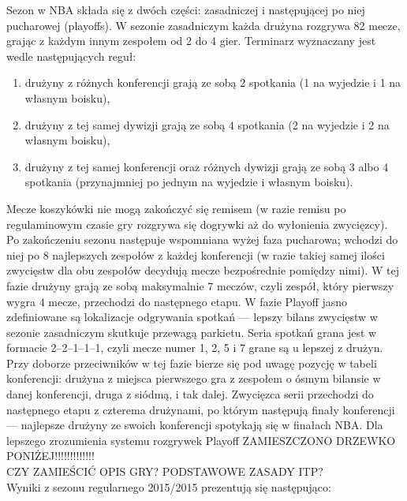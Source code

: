 \documentclass[inzynierska]{pwr_wmat_praca_dyplomowa}
\theoremstyle{plain}
\numberwithin{theorem}{chapter}
\theoremstyle{definition}
\numberwithin{theorem}{chapter}
\begin{document}
Sezon w NBA składa się z dwóch części: zasadniczej i następującej po niej pucharowej (playoffs). W sezonie zasadniczym każda drużyna rozgrywa 82 mecze, grając z każdym innym zespołem od 2 do 4 gier. Terminarz wyznaczany jest wedle następujących reguł:
\begin{enumerate}
	\item drużyny z różnych konferencji grają ze sobą 2 spotkania (1 na wyjedzie i 1 na własnym boisku),
	\item drużyny z tej samej dywizji grają ze sobą 4 spotkania (2 na wyjedzie i 2 na własnym boisku),
	\item drużyny z tej samej konferencji oraz różnych dywizji grają ze sobą 3 albo 4 spotkania (przynajmniej po jednym na wyjedzie i własnym boisku).
\end{enumerate}
Mecze koszykówki nie mogą zakończyć się remisem (w razie remisu po regulaminowym czasie gry rozgrywa się dogrywki aż do wyłonienia zwycięzcy).
Po zakończeniu sezonu następuje wspomniana wyżej faza pucharowa; wchodzi do niej po 8 najlepszych zespołów z każdej konferencji (w razie takiej samej ilości zwycięstw dla obu zespołów decydują mecze bezpośrednie pomiędzy nimi). W tej fazie drużyny grają ze sobą maksymalnie 7 meczów, czyli zespół, który pierwszy wygra 4 mecze, przechodzi do następnego etapu. W fazie Playoff jasno zdefiniowane są lokalizacje odgrywania spotkań --- lepszy bilans zwycięstw w sezonie zasadniczym skutkuje przewagą parkietu. Seria spotkań grana jest w formacie 2–2–1–1–1, czyli mecze numer 1, 2, 5 i 7 grane są u lepszej z drużyn. Przy doborze przeciwników w tej fazie bierze się pod uwagę pozycję w tabeli konferencji: drużyna z miejsca pierwszego gra z zespołem o ósmym bilansie w danej konferencji, druga z siódmą, i tak dalej. Zwycięzca serii przechodzi do następnego etapu z czterema drużynami, po którym następują finały konferencji --- najlepsze drużyny ze swoich konferencji spotykają się w finałach NBA. Dla lepszego zrozumienia systemu rozgrywek Playoff ZAMIESZCZONO DRZEWKO PONIŻEJ!!!!!!!!!!!!! 
\\
CZY ZAMIEŚCIĆ OPIS GRY? PODSTAWOWE ZASADY ITP?
\\
Wyniki z sezonu regularnego 2015/2015 prezentują się następująco:
\end{document}
